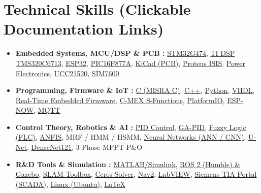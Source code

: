 \documentclass[10pt,a4paper]{article}
\begin{document}
\section*{Technical Skills (Clickable Documentation Links)}
\begin{itemize}
\item \textbf{Embedded Systems, MCU/DSP \& PCB :} \href{https://www.st.com/en/microcontrollers-microprocessors/stm32g474re.html}{STM32G474}, \href{https://www.ti.com/product/TMS320C6713B}{TI DSP TMS320C6713}, \href{https://www.espressif.com/en/products/socs/esp32}{ESP32}, \href{https://www.microchip.com/en-us/product/PIC16F877A}{PIC16F877A}, \href{https://www.kicad.org/}{KiCad (PCB)}, \href{https://www.labcenter.com/}{Proteus ISIS}, \href{https://www.mathworks.com/solutions/power-electronics-control.html}{Power Electronics}, \href{https://www.ti.com/product/UCC21520}{UCC21520}, \href{https://www.simcom.com/product/SIM7600X-H.html}{SIM7600}
\item \textbf{Programming, Firmware \& IoT :} \href{https://misra.org.uk/}{C (MISRA C)}, \href{https://isocpp.org/}{C++}, \href{https://www.python.org/}{Python}, \href{https://standards.ieee.org/ieee/1076/6769/}{VHDL}, \href{https://www.freertos.org/}{Real-Time Embedded Firmware}, \href{https://www.mathworks.com/help/simulink/sfg/what-is-an-s-function.html}{C-MEX S-Functions}, \href{https://platformio.org/}{PlatformIO}, \href{https://www.espressif.com/en/solutions/low-power-solutions/esp-now}{ESP-NOW}, \href{https://mqtt.org/}{MQTT}
\item \textbf{Control Theory, Robotics \& AI :} \href{https://www.mathworks.com/discovery/pid-control.html}{PID Control}, \href{https://www.mathworks.com/discovery/genetic-algorithm.html}{GA-PID}, \href{https://www.mathworks.com/products/fuzzy-logic.html}{Fuzzy Logic (FLC)}, \href{https://www.mathworks.com/help/fuzzy/neuro-adaptive-learning-and-anfis.html}{ANFIS}, MRF / HMM / HSMM, \href{https://pytorch.org/}{Neural Networks (ANN / CNN)}, \href{https://arxiv.org/abs/1505.04597}{U-Net}, \href{https://arxiv.org/abs/1608.06993}{DenseNet121}, 3-Phase MPPT P\&O
\item \textbf{R\&D Tools \& Simulation :} \href{https://www.mathworks.com/products/simulink.html}{MATLAB/Simulink}, \href{https://docs.ros.org/en/humble/}{ROS 2 (Humble) \& Gazebo}, \href{https://github.com/SteveMacenski/slam_toolbox}{SLAM Toolbox}, \href{http://ceres-solver.org/}{Ceres Solver}, \href{https://navigation.ros.org/}{Nav2}, \href{https://www.ni.com/en/shop/labview.html}{LabVIEW}, \href{https://www.siemens.com/global/en/products/automation/industry-software/automation-software/tia-portal.html}{Siemens TIA Portal (SCADA)}, \href{https://ubuntu.com/}{Linux (Ubuntu)}, \href{https://www.latex-project.org/}{LaTeX}
\end{itemize}
\end{document}
